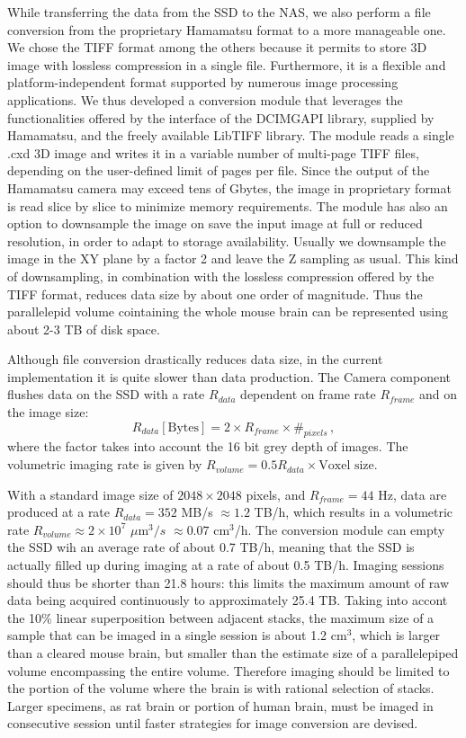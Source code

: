 \documentclass[12pt]{spieman}  %
\begin{document}
While transferring the data from the SSD to the NAS, we also perform a file conversion from the proprietary Hamamatsu format to a more manageable one. We chose the TIFF format among the others because it permits to store 3D image with lossless compression in a single file. Furthermore, it is a flexible and platform-independent format supported by numerous image processing applications. We thus developed a conversion module that leverages the functionalities offered by the interface of the DCIMGAPI library, supplied by Hamamatsu, and the freely available LibTIFF library. The module reads a single .cxd 3D image and writes it in a variable number of multi-page TIFF files, depending on the user-defined limit of pages per file. Since the output of the Hamamatsu camera may exceed tens of Gbytes, the image in proprietary format is read slice by slice to minimize memory requirements. The module has also an option to downsample the image on save the input image at full or reduced resolution, in order to adapt to storage availability. Usually we downsample the image in the XY plane by a factor 2 and leave the Z sampling as usual. This kind of downsampling, in combination with the lossless compression offered by the TIFF format, reduces data size by about one order of magnitude. Thus the parallelepid volume cointaining the whole mouse brain can be represented using about 2-3 TB of disk space.

Although file conversion drastically reduces data size, in the current implementation it is quite slower than data production. The Camera component flushes data on the SSD with a rate $R_{data}$ dependent on frame rate $R_{frame}$ and on the image size:
\begin{equation}
R_{data} [\text{Bytes}] = 2\times R_{frame} \times \#_{pixels}\,,
\end{equation}
where the factor takes into account the 16 bit grey depth of images. The volumetric imaging rate is given by $R_{volume} = 0.5 R_{data} \times \text{Voxel size}$.

With a standard image size of $2048\times 2048$ pixels, and $R_{frame}=44$ Hz, data are produced at a rate $R_{data}=352$ MB/s $\approx 1.2$ TB/h, which results in a volumetric rate $R_{volume} \approx 2\times 10^7$ $\mu\text{m}^3/s$ $\approx 0.07$ $\text{cm}^3$/h. The conversion module can empty the SSD wih an average rate of about 0.7 TB/h, meaning that the SSD is actually filled up during imaging at a rate of about 0.5 TB/h. Imaging sessions should thus be shorter than 21.8 hours: this limits the maximum amount of raw data being acquired continuously to approximately 25.4 TB. Taking into accont the 10\% linear superposition between adjacent stacks, the maximum size of a sample that can be imaged in a single session is about 1.2 $\text{cm}^3$, which is larger than a cleared mouse brain, but smaller than the estimate size of a parallelepiped volume encompassing the entire volume. Therefore imaging should be limited to the portion of the volume where the brain is with rational selection of stacks. Larger specimens, as rat brain or portion of human brain, must be imaged in consecutive session until faster strategies for image conversion are devised.
\end{document}
